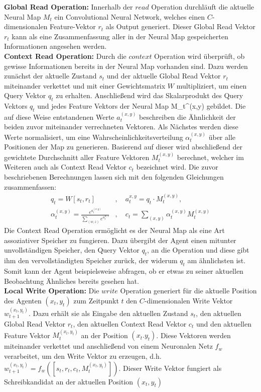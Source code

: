 \textbf{Global Read Operation:} Innerhalb der $read$ Operation durchläuft die aktuelle Neural Map $M_t$ ein Convolutional Neural Network, welches einen $C$-dimensionalen Feature-Vektor $r_t$ als Output generiert. Dieser Global Read Vektor $r_t$ kann als eine Zusammenfassung aller in der Neural Map gespeicherten Informationen angesehen werden. \\[0.1in]
\textbf{Context Read Operation:} Durch die $context$ Operation wird überprüft, ob gewisse Informationen bereits in der Neural Map vorhanden sind. Dazu werden zunächst der aktuelle Zustand $s_t$ und der aktuelle Global Read Vektor $r_t$ miteinander verkettet und mit einer Gewichtsmatrix $W$ multipliziert, um einen Query Vektor $q_t$ zu erhalten. Anschließend wird das Skalarprodukt des Query Vektors $q_t$ und jedes Feature Vektors der Neural Map M_t^{(x,y)} gebildet. Die auf diese Weise entstandenen Werte $a_t^{(x,y)}$ beschreiben die Ähnlichkeit der beiden zuvor miteinander verrechneten Vektoren. Als Nächstes werden diese Werte normalisiert, um eine Wahrscheinlichkeitsverteilung $\alpha_t^{(x,y)}$ über alle Positionen der Map zu generieren. Basierend auf dieser wird abschließend der gewichtete Durchschnitt aller Feature Vektoren $M_t^{(x,y)}$ berechnet, welcher im Weiteren auch als Context Read Vektor $c_t$ bezeichnet wird. Die zuvor beschriebenen Berechnungen lassen sich mit den folgenden Gleichungen zusammenfassen:
\begin{equation}
  \begin{aligned}
    q_t = W [s_t, r_t]&, \quad a_t^{x,y} = q_t \cdot M_t^{(x,y)}, \\
    \alpha_t^{(x,y)} = \frac{e^{a_t^{(x,y)}}}{\sum_{(w,z)} e^{a_t^{w,z}}}&, \quad c_t = \sum_{(x,y)} \alpha_t^{(x,y)} M_t^{(x,y)}
  \end{aligned}
\end{equation}
Die Context Read Operation ermöglicht es der Neural Map als eine Art assoziativer Speicher zu fungieren. Dazu übergibt der Agent einen mitunter unvollständigen Speicher, den Query Vektor $q_t$, an die Operation und diese gibt ihm den vervollständigten Speicher zurück, der widerum $q_t$ am ähnlichsten ist. Somit kann der Agent beispielsweise abfragen, ob er etwas zu seiner aktuellen Beobachtung Ähnliches bereits gesehen hat. \\[0.1in]
\textbf{Local Write Operation:} Die $write$ Operation generiert für die aktuelle Position des Agenten $(x_t,y_t)$ zum Zeitpunkt $t$ den $C$-dimensionalen Write Vektor $w_{t+1}^{(x_t,y_t)}$. Dazu erhält sie als Eingabe den aktuellen Zustand $s_t$, den aktuellen Global Read Vektor $r_t$, den aktuellen Context Read Vektor $c_t$ und den aktuellen Feature Vektor $M_t^{(x_t,y_t)}$ an der Position $(x_t.y_t)$. Diese Vektoren werden miteinander verkettet und anschließend von einem Neuronalen Netz $f_w$ verarbeitet, um den Write Vektor zu erzeugen, d.h. $w_{t+1}^{(x_t,y_t)} = f_w([s_t, r_t, c_t, M_t^{(x_t,y_t)}])$. Dieser Write Vektor fungiert als Schreibkandidat an der aktuellen Position $(x_t, y_t)$ \\[0.1in]
